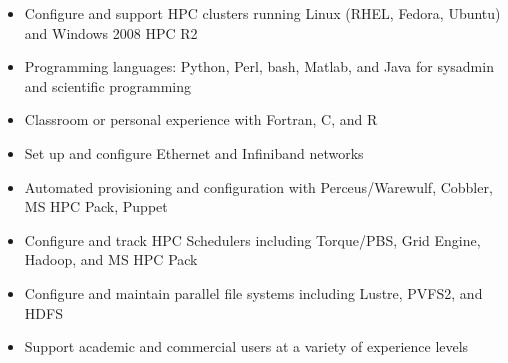 \documentclass[12pt]{article}
\begin{document}
\begin{itemize}\setlength{\itemsep}{0cm}
\setlength{\parskip}{0cm}

\item Configure and support HPC clusters running Linux (RHEL, Fedora, Ubuntu) and Windows 2008 HPC R2
\item Programming languages: Python, Perl, bash, Matlab, and Java for sysadmin and scientific programming
\item Classroom or personal experience with Fortran, C, and R
\item Set up and configure Ethernet and Infiniband networks
\item Automated provisioning and configuration with Perceus/Warewulf, Cobbler, MS HPC Pack, Puppet
\item Configure and track HPC Schedulers including Torque/PBS, Grid Engine, Hadoop, and MS HPC Pack
\item Configure and maintain parallel file systems including Lustre, PVFS2, and HDFS
\item Support academic and commercial users at a variety of experience levels
%
%

\end{itemize}
\end{document}
